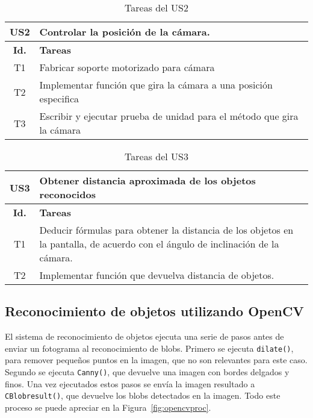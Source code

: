 \begin{table}[ht]
\centering
\begin{tabular}{|c|p{13cm}|}
\hline
\textbf{US2} & \textbf{Controlar la posición de la cámara.} \\
\hline
\hline
\textbf{Id.} & \textbf{Tareas} \\
\hline
T1 & Fabricar soporte motorizado para cámara \\ \hline
T2 & Implementar función que gira la cámara a una posición especifica \\ \hline
T3 & Escribir y ejecutar prueba de unidad para el método que gira la cámara \\ \hline
\end{tabular}
\caption{Tareas del US2}
\label{table:tareasUS2}
\end{table}


\begin{table}[ht]
\centering
\begin{tabular}{|c|p{13cm}|}
\hline
\textbf{US3} & \textbf{Obtener distancia aproximada de los objetos reconocidos} \\
\hline
\hline
\textbf{Id.} & \textbf{Tareas} \\
\hline
T1 & Deducir fórmulas para obtener la distancia de los objetos en la pantalla, de acuerdo con el ángulo de inclinación de la cámara. \\ \hline
T2 & Implementar función que devuelva distancia de objetos. \\ \hline
\end{tabular}
\caption{Tareas del US3}
\label{table:tareasUS3_1}
\end{table}

\subsection{Reconocimiento de objetos utilizando OpenCV}\label{sec:recopencv}
El sistema de reconocimiento de objetos ejecuta una serie de pasos antes de enviar un fotograma al reconocimiento de blobs. Primero se ejecuta \texttt{dilate()}, para remover pequeños puntos en la imagen, que no son relevantes para este caso. Segundo se ejecuta \texttt{Canny()}, que devuelve una imagen con bordes delgados y finos. Una vez ejecutados estos pasos se envía la imagen resultado a \texttt{CBlobresult()}, que devuelve los blobs detectados en la imagen. Todo este proceso se puede apreciar en la Figura~\ref{fig:opencvproc}.

